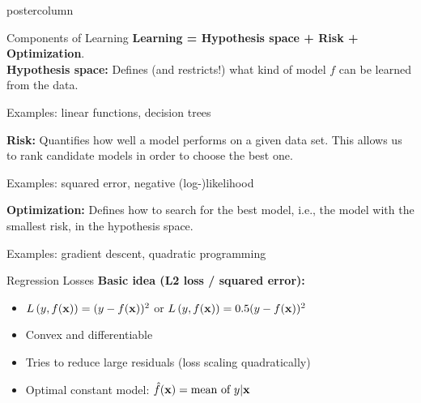 \documentclass{beamer}
\begin{document}
\begin{frame}[fragile]{}
\begin{columns}
\begin{column}{.31\textwidth}
\begin{beamercolorbox}[center]{postercolumn}
\begin{minipage}{.98\textwidth}
{\begin{myblock}{Components of Learning}
            \textbf{Learning = Hypothesis space + Risk  + Optimization}. \\
        
            \textbf{Hypothesis space: } Defines (and restricts!) what kind of model $f$
        can be learned from the data.
            
            Examples: linear functions, decision trees
          
          \vspace*{0.5ex}
          
          \textbf{Risk: } Quantifies how well a model performs on a given
        data set. This allows us to rank candidate models in order to choose the best one.
        
          Examples: squared error, negative (log-)likelihood
          
          \vspace*{0.5ex}
          
          \textbf{Optimization: } Defines how to search for the best model, i.e., the model with the smallest {risk}, in the hypothesis space.
          
          Examples: gradient descent, quadratic programming
        
            
          \end{myblock}
          \begin{myblock}{Regression Losses}
			        \textbf{Basic idea (L2 loss / squared error):} 
						\begin{itemize}    
						  \setlength{\itemindent}{+.3in}
              \item $L\left(y, f(\mathbf{x})\right) = (y-f(\mathbf{x}))^2$ or $L\left(y, f(\mathbf{x})\right) = 0.5 (y-f(\mathbf{x}))^2$
              \item Convex and differentiable
              \item Tries to reduce large residuals (loss scaling quadratically)
              \item Optimal constant model: $\hat{f}(\mathbf{x}) = \text{mean of } y | \mathbf{x}$
            \end{itemize}

            \vspace*{1ex}


\end{myblock}}
\end{minipage}
\end{beamercolorbox}
\end{column}
\end{columns}
\end{frame}
\end{document}
